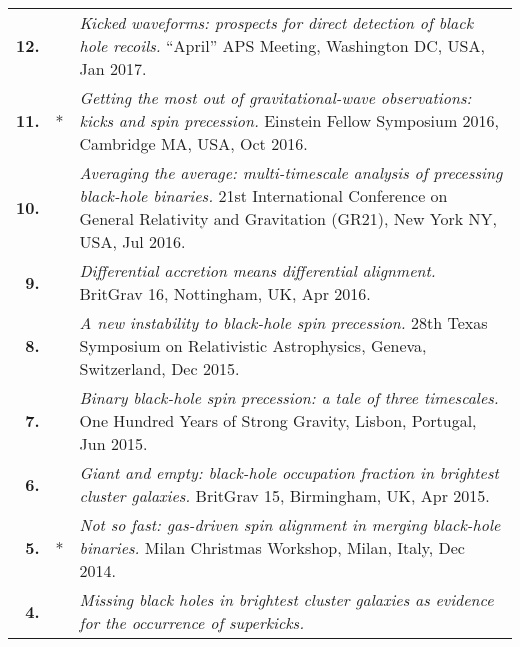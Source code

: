 \documentclass[11pt,letterpaper,sans]{moderncv}   %
\begin{document}
{\begin{longtable}{rp{0.4cm}p{15.8cm}}
%
\textbf{12.} & & \textit{Kicked waveforms: prospects for direct detection of black hole recoils.}
\newline{}``April'' APS Meeting, Washington DC, USA, Jan 2017.
\vspace{0.05cm}\\
%
\textbf{11.} & * & \textit{Getting the most out of gravitational-wave observations: kicks and spin precession.}
\newline{}Einstein Fellow Symposium 2016, Cambridge MA, USA, Oct 2016.
\vspace{0.05cm}\\
%
\textbf{10.} & & \textit{Averaging the average: multi-timescale analysis of precessing black-hole binaries.}
\newline{}21st International Conference on General Relativity and Gravitation (GR21), New York NY, USA, Jul 2016.
\vspace{0.05cm}\\
%
\textbf{9.} & & \textit{Differential accretion means differential alignment.}
\newline{}BritGrav 16, Nottingham, UK, Apr 2016.
\vspace{0.05cm}\\
%
\textbf{8.} & & \textit{A new instability to black-hole spin precession.}
\newline{}28th Texas Symposium on Relativistic Astrophysics, Geneva, Switzerland, Dec 2015.
\vspace{0.05cm}\\
%
\textbf{7.} & & \textit{Binary black-hole spin precession: a tale of three timescales.}
\newline{} 
One Hundred Years of Strong Gravity, Lisbon, Portugal, Jun 2015.
\vspace{0.05cm}\\
%
\textbf{6.} & & \textit{Giant and empty: black-hole occupation fraction in brightest cluster galaxies.}
\newline{} 
BritGrav 15, Birmingham, UK, Apr 2015.
\vspace{0.05cm}\\
%
\textbf{5.} & * & \textit{Not so fast: gas-driven spin alignment in merging black-hole binaries.}
\newline{} 
Milan Christmas Workshop, Milan, Italy, Dec 2014.
\vspace{0.05cm}\\
%
\textbf{4.} & & \textit{Missing black holes in brightest cluster galaxies as evidence for the occurrence of superkicks.}
\newline{} 

\end{longtable}}
\end{document}
